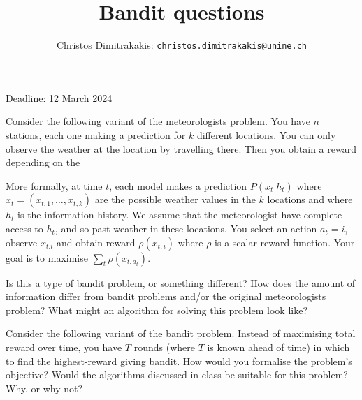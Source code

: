 \documentclass[twoside,a4paper]{article}
\begin{document}
\title{Bandit questions}

\author{Christos Dimitrakakis: \texttt{christos.dimitrakakis@unine.ch}}

\maketitle
\large{Deadline: 12 March 2024}


\vspace{1em}

\begin{exercise}
  Consider the following variant of the meteorologists problem.  You
  have $n$ stations, each one making a prediction for $k$ different
  locations. You can only observe the weather at the location by
  travelling there. Then you obtain a reward depending on the 

  More formally, at time $t$, each model makes a prediction
  $P(x_{t} | h_t)$ where $x_{t} = (x_{t,1}, \ldots, x_{t,k})$ are the
  possible weather values in the $k$ locations and where $h_t$ is the
  information history. We assume that the meteorologist have complete
  access to $h_t$, and so past weather in these locations. You select
  an action $a_t = i$, observe $x_{t.i}$ and obtain reward $\rho(x_{t,i})$ where $\rho$ is a scalar reward function. Your goal is to maximise $\sum_t \rho(x_{t,a_t})$.

  Is this a type of bandit problem, or something different? How does the amount of information differ from bandit problems and/or the original meteorologists problem? What might an algorithm for solving this problem look like?
\end{exercise}


\begin{exercise}
  Consider the following variant of the bandit problem.  Instead of maximising total reward over time, you have $T$ rounds (where $T$ is known ahead of time) in which to find the highest-reward giving bandit. How would you formalise the problem's objective? Would the algorithms discussed in class be suitable for this problem? Why, or why not?
\end{exercise}
\end{document}
